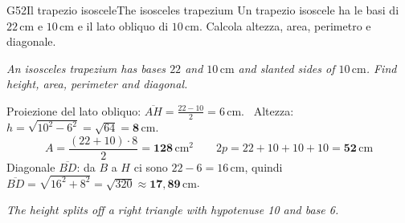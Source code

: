 \documentclass[11pt,a4paper]{article}
\newcommand{\en}[1]{\par{\small\itshape\color{engray}#1\par}}
\newcommand{\seg}[1]{\overline{#1}}
\newcommand{\unit}[1]{\,\mathrm{#1}}
\newcommand{\cm}{\unit{cm}}
\newcommand{\cmq}{\unit{cm^2}}
\begin{document}
\begin{esercizio}{G5}{2}{Il trapezio isoscele}{The isosceles trapezium}
Un trapezio isoscele ha le basi di $22\cm$ e $10\cm$ e il lato obliquo di $10\cm$. Calcola altezza, area, perimetro e diagonale.
\en{An isosceles trapezium has bases $22$ and $10\cm$ and slanted sides of $10\cm$. Find height, area, perimeter and diagonal.}
\begin{center}
\end{center}
\end{esercizio}
\begin{solbox}
Proiezione del lato obliquo: $\seg{AH}=\frac{22-10}{2}=6\cm$. \ Altezza: $h=\sqrt{10^2-6^2}=\sqrt{64}=\mathbf{8\cm}$.
\[A=\frac{(22+10)\cdot8}{2}=\mathbf{128\cmq}\qquad 2p=22+10+10+10=\mathbf{52\cm}\]
Diagonale $\seg{BD}$: da $B$ a $H$ ci sono $22-6=16\cm$, quindi $\seg{BD}=\sqrt{16^2+8^2}=\sqrt{320}\approx\mathbf{17,89\cm}$.
\en{The height splits off a right triangle with hypotenuse 10 and base 6.}
\end{solbox}
\end{document}
